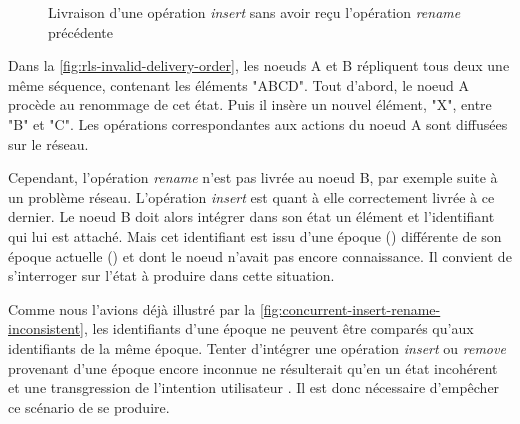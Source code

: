 \begin{figure}[!ht]
{
  }
  \caption{Livraison d'une opération \emph{insert} sans avoir reçu l'opération \emph{rename} précédente}
  \label{fig:rls-invalid-delivery-order}
\end{figure}

Dans la \autoref{fig:rls-invalid-delivery-order}, les noeuds A et B répliquent tous deux une même séquence, contenant les éléments "ABCD".
Tout d'abord, le noeud A procède au renommage de cet état.
Puis il insère un nouvel élément, "X", entre "B" et "C".
Les opérations correspondantes aux actions du noeud A sont diffusées sur le réseau.

Cependant, l'opération \emph{rename} n'est pas livrée au noeud B, par exemple suite à un problème réseau.
L'opération \emph{insert} est quant à elle correctement livrée à ce dernier.
Le noeud B doit alors intégrer dans son état un élément et l'identifiant qui lui est attaché.
Mais cet identifiant est issu d'une époque () différente de son époque actuelle () et dont le noeud n'avait pas encore connaissance.
Il convient de s'interroger sur l'état à produire dans cette situation.

Comme nous l'avions déjà illustré par la \autoref{fig:concurrent-insert-rename-inconsistent}, les identifiants d'une époque ne peuvent être comparés qu'aux identifiants de la même époque.
Tenter d'intégrer une opération \emph{insert} ou \emph{remove} provenant d'une époque encore inconnue ne résulterait qu'en un état incohérent et une transgression de l'intention utilisateur .
Il est donc nécessaire d'empêcher ce scénario de se produire.

